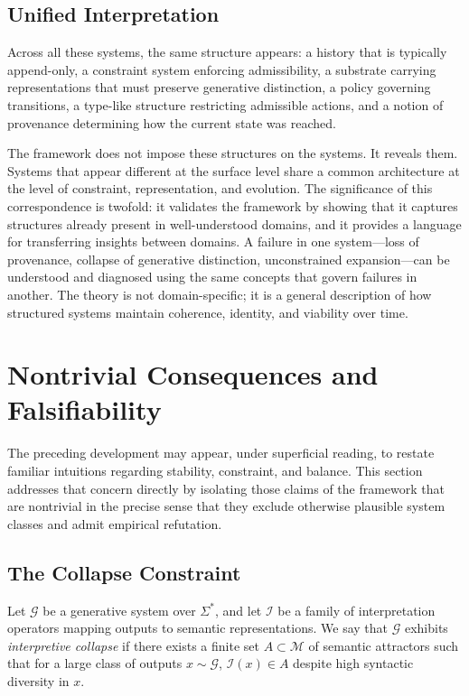 \documentclass[12pt, a4paper]{article}
\theoremstyle{plain}
\theoremstyle{definition}
\theoremstyle{remark}
\begin{document}
\subsection{Unified Interpretation}

Across all these systems, the same structure appears: a history that is typically append-only, a constraint system enforcing admissibility, a substrate carrying representations that must preserve generative distinction, a policy governing transitions, a type-like structure restricting admissible actions, and a notion of provenance determining how the current state was reached.

The framework does not impose these structures on the systems. It reveals them. Systems that appear different at the surface level share a common architecture at the level of constraint, representation, and evolution. The significance of this correspondence is twofold: it validates the framework by showing that it captures structures already present in well-understood domains, and it provides a language for transferring insights between domains. A failure in one system---loss of provenance, collapse of generative distinction, unconstrained expansion---can be understood and diagnosed using the same concepts that govern failures in another. The theory is not domain-specific; it is a general description of how structured systems maintain coherence, identity, and viability over time.

\section{Nontrivial Consequences and Falsifiability}

The preceding development may appear, under superficial reading, to restate familiar intuitions regarding stability, constraint, and balance. This section addresses that concern directly by isolating those claims of the framework that are nontrivial in the precise sense that they exclude otherwise plausible system classes and admit empirical refutation.

\subsection{The Collapse Constraint}

Let $\mathcal{G}$ be a generative system over $\Sigma^*$, and let $\mathcal{I}$ be a family of interpretation operators mapping outputs to semantic representations. We say that $\mathcal{G}$ exhibits \emph{interpretive collapse} if there exists a finite set $A \subset \mathcal{M}$ of semantic attractors such that for a large class of outputs $x \sim \mathcal{G}$, $\mathcal{I}(x) \in A$ despite high syntactic diversity in $x$.
\end{document}
